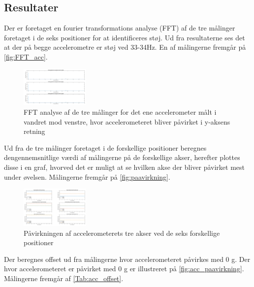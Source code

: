 \subsection{Resultater}
Der er foretaget en fourier transformations analyse (FFT) af de tre målinger foretaget i de seks positioner for at identificeres støj. Ud fra resultaterne ses det at der på begge accelerometre er støj ved 33-34Hz. En af målingerne fremgår på \autoref{fig:FFT_acc}. 

\begin{figure}[H]
\centering
\includegraphics[width=0.3\textwidth]{figures/FFT_acc}
\caption{FFT analyse af de tre målinger for det ene accelerometer målt i vandret mod venstre, hvor accelerometeret bliver påvirket i y-aksens retning}
\label{fig:FFT_acc}
\end{figure}

Ud fra de tre målinger foretaget i de forskellige positioner beregnes dengennemsnitlige værdi af målingerne på de forskellige akser, herefter plottes disse i en graf, hvorved det er muligt at se hvilken akse der bliver påvirket mest under øvelsen. Målingerne fremgår på \autoref{fig:paavirkning}. 

\begin{figure}[H]
\centering
\includegraphics[width=0.3\textwidth]{figures/paavirkning}
\caption{Påvirkningen af accelerometerets tre akser ved de seks forskellige positioner}
\label{fig:paavirkning}
\end{figure}

Der beregnes offset ud fra målingerne hvor accelerometeret påvirkes med 0 g. Der hvor accelerometeret er påvirket med 0 g er illustreret på \autoref{fig:acc_paavirkning}. Målingerne fremgår af \autoref{Tab:acc_offset}. 


